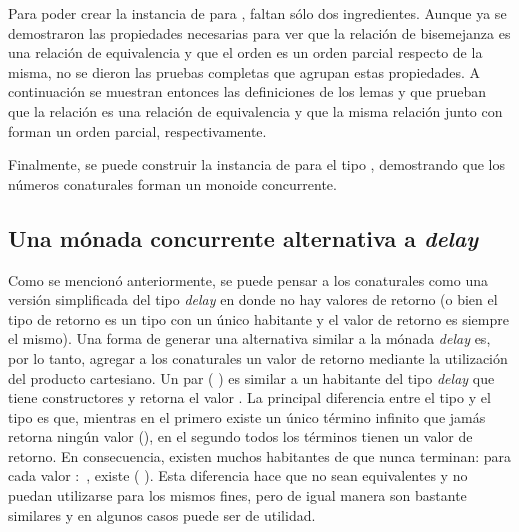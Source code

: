 Para poder crear la instancia de  para , faltan sólo dos ingredientes. Aunque ya se demostraron las propiedades necesarias para ver que la relación de bisemejanza es una relación de equivalencia y que el orden es un orden parcial respecto de la misma, no se dieron las pruebas completas que agrupan estas propiedades. A continuación se muestran entonces las definiciones de los lemas  y  que prueban que la relación \AgdaFunction{[ $\infty$ ]\_$\sim$\_} es una relación de equivalencia y que la misma relación junto con \AgdaFunction{[ $\infty$ ]\_$\leq$\_} forman un orden parcial, respectivamente.

Finalmente, se puede construir la instancia de  para el tipo , demostrando que los números conaturales forman un monoide concurrente. 

\subsection{Una mónada concurrente alternativa a \textit{delay}}

Como se mencionó anteriormente, se puede pensar a los conaturales como una versión simplificada del tipo \textit{delay} en donde no hay valores de retorno (o bien el tipo de retorno es un tipo con un único habitante y el valor de retorno es siempre el mismo). Una forma de generar una alternativa similar a la mónada \textit{delay} es, por lo tanto, agregar a los conaturales un valor de retorno mediante la utilización del producto cartesiano. Un par ( \AgdaInductiveConstructor{,} ) es similar a un habitante del tipo \textit{delay} que tiene  constructores  y retorna el valor . La principal diferencia entre el tipo  \AgdaDatatype{$\bot$} y el tipo   es que, mientras en el primero existe un único término infinito que jamás retorna ningún valor (), en el segundo todos los términos tienen un valor de retorno. En consecuencia, existen muchos habitantes de   que nunca terminan: para cada valor  $:$ , existe ( \AgdaInductiveConstructor{,} ). Esta diferencia hace que no sean equivalentes y no puedan utilizarse para los mismos fines, pero de igual manera son bastante similares y en algunos casos puede ser de utilidad. 

